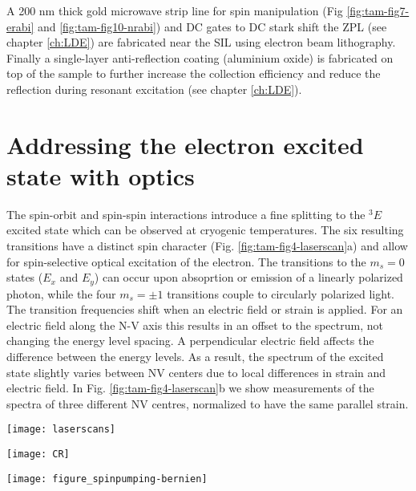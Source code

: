 A 200 nm thick gold microwave strip line for spin manipulation (Fig \ref{fig:tam-fig7-erabi} and \ref{fig:tam-fig10-nrabi}) and DC gates to DC stark shift the ZPL (see chapter \ref{ch:LDE}) are  fabricated near the SIL using electron beam lithography. Finally a single-layer anti-reflection coating\cite{Yeung__2012} (aluminium oxide) is fabricated on top of the sample to further increase the collection efficiency and reduce the reflection during resonant excitation (see chapter \ref{ch:LDE}).

\section{Addressing the electron excited state with optics}
\label{sec:opticalcontrol}

The spin-orbit and spin-spin interactions introduce a fine splitting to the $^3E$ excited state which can be observed at cryogenic temperatures. The six resulting transitions have a distinct spin character (Fig. \ref{fig:tam-fig4-laserscan}a) and allow for spin-selective optical excitation of the electron. The transitions to the $m_s = 0$ states ($E_x$ and $E_y$) can occur upon absoprtion or emission of a linearly polarized photon, while the four $m_s = \pm 1$ transitions couple to circularly polarized light. The transition frequencies shift when an electric field or strain is applied. For an electric field along the N-V axis this results in an offset to the spectrum, not changing the energy level spacing. A perpendicular electric field affects the difference between the energy levels. As a result, the spectrum of the excited state slightly varies between NV centers due to local differences in strain and electric field. In Fig. \ref{fig:tam-fig4-laserscan}b we show measurements of the spectra of three different NV centres, normalized to have the same parallel strain.
\begin{figure*}
	\centering
	\texttt{[image: laserscans]}
	\caption{\label{fig:tam-fig4-laserscan} \textbf{} (a) }
\end{figure*}

\begin{figure*}
	\centering
	\texttt{[image: CR]}
	\caption{\label{fig:tam-fig4-cr} \textbf{} (a) }
\end{figure*}

\begin{figure*}
	\centering
	\texttt{[image: figure\_spinpumping-bernien]}
	\caption{\label{fig:tam-fig5-SP} Figure from \cite{Bernien__2014} \textbf{} (a) }
\end{figure*}

